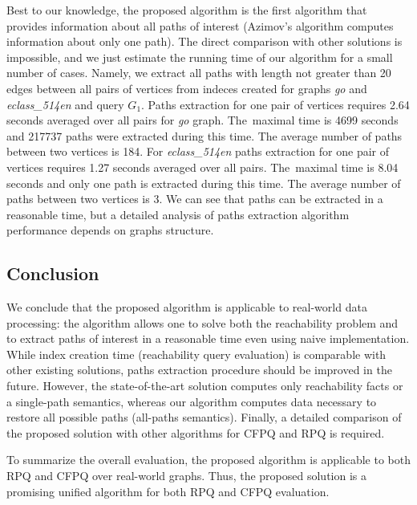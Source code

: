 Best to our knowledge, the proposed algorithm is the first algorithm that provides information about all paths of interest (Azimov's algorithm computes information about only one path).
The direct comparison with other solutions is impossible, and we just estimate the running time of our algorithm for a small number of cases.
Namely, we extract all paths with length not greater than 20 edges between all pairs of vertices from indeces created for graphs \textit{go} and \textit{eclass\_514en} and query $G_1$.
Paths extraction for one pair of vertices requires 2.64 seconds averaged over all pairs for \textit{go} graph. The~maximal time is 4699 seconds and 217737 paths were extracted during this time. The average number of paths between two vertices is 184.
For \textit{eclass\_514en} paths extraction for one pair of vertices requires 1.27 seconds averaged over all pairs. The~maximal time is 8.04 seconds and only one path is extracted during this time. The average number of paths between two vertices is 3.
We can see that paths can be extracted in a reasonable time, but a detailed analysis of paths extraction algorithm performance depends on graphs structure.


\subsection{Conclusion}

We conclude that the proposed algorithm is applicable to real-world data processing: the algorithm allows one to solve both the reachability problem and to extract paths of interest in a reasonable time even using naive implementation.
While index creation time (reachability query evaluation) is comparable with other existing solutions, paths extraction procedure should be improved in the future. However, the state-of-the-art solution computes only reachability facts or a single-path semantics, whereas our algorithm computes data necessary to restore all possible paths (all-paths semantics).
Finally, a detailed comparison of the proposed solution with other algorithms for CFPQ and RPQ is required.

To summarize the overall evaluation, the proposed algorithm is applicable to both RPQ and CFPQ over real-world graphs.
Thus, the proposed solution is a promising unified algorithm for both RPQ and CFPQ evaluation.
